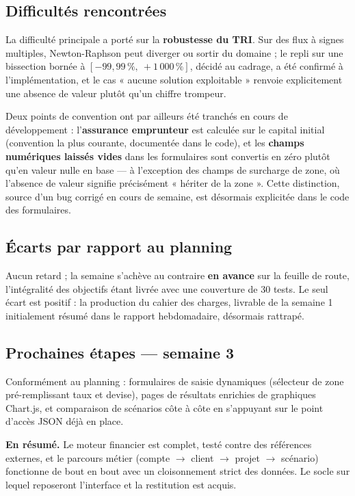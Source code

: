 \documentclass[11pt,a4paper]{article}
\begin{document}

\subsection{Difficultés rencontrées}
La difficulté principale a porté sur la \textbf{robustesse du TRI}. Sur des flux à signes multiples, Newton-Raphson peut diverger ou sortir du domaine ; le repli sur une bissection bornée à $[-99{,}99\,\%,\ +1\,000\,\%]$, décidé au cadrage, a été confirmé à l'implémentation, et le cas « aucune solution exploitable » renvoie explicitement une absence de valeur plutôt qu'un chiffre trompeur.

Deux points de convention ont par ailleurs été tranchés en cours de développement : l'\textbf{assurance emprunteur} est calculée sur le capital initial (convention la plus courante, documentée dans le code), et les \textbf{champs numériques laissés vides} dans les formulaires sont convertis en zéro plutôt qu'en valeur nulle en base — à l'exception des champs de surcharge de zone, où l'absence de valeur signifie précisément « hériter de la zone ». Cette distinction, source d'un bug corrigé en cours de semaine, est désormais explicitée dans le code des formulaires.

\subsection{Écarts par rapport au planning}
Aucun retard ; la semaine s'achève au contraire \textbf{en avance} sur la feuille de route, l'intégralité des objectifs étant livrée avec une couverture de 30 tests. Le seul écart est positif : la production du cahier des charges, livrable de la semaine 1 initialement résumé dans le rapport hebdomadaire, désormais rattrapé.

\subsection{Prochaines étapes --- semaine 3}
Conformément au planning : formulaires de saisie dynamiques (sélecteur de zone pré-remplissant taux et devise), pages de résultats enrichies de graphiques Chart.js, et comparaison de scénarios côte à côte en s'appuyant sur le point d'accès JSON déjà en place.

\vspace{0.6cm}
\begin{tcolorbox}[colback=eccblue!5,colframe=eccblue!60,boxrule=0.6pt,arc=2pt,
	left=8pt,right=8pt,top=6pt,bottom=6pt]
	\small
	\textbf{\color{eccblue}En résumé.} Le moteur financier est complet, testé contre des références externes, et le parcours métier (compte $\rightarrow$ client $\rightarrow$ projet $\rightarrow$ scénario) fonctionne de bout en bout avec un cloisonnement strict des données. Le socle sur lequel reposeront l'interface et la restitution est acquis.
\end{tcolorbox}
\end{document}
